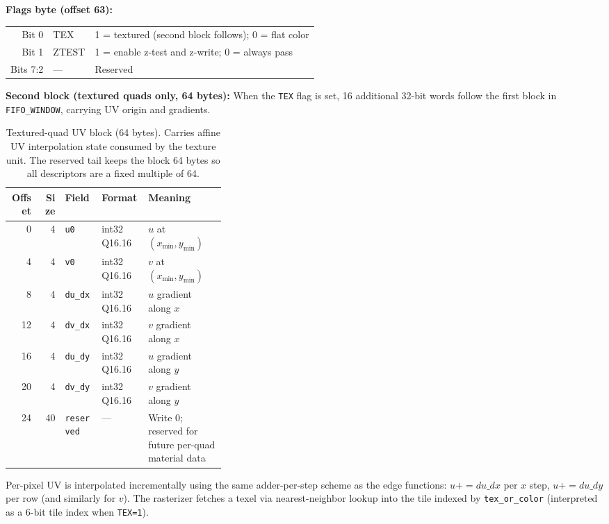 \documentclass[11pt]{article}
\begin{document}
\vspace{0.8em}
\noindent\textbf{Flags byte (offset 63):}

\begin{tabular}{rll}
Bit 0 & TEX   & 1 = textured (second block follows); 0 = flat color \\
Bit 1 & ZTEST & 1 = enable z-test and z-write; 0 = always pass \\
Bits 7:2 & --- & Reserved \\
\end{tabular}

\vspace{0.8em}
\noindent\textbf{Second block (textured quads only, 64 bytes):} When the \texttt{TEX} flag is set, 16 additional 32-bit words follow the first block in \texttt{FIFO\_WINDOW}, carrying UV origin and gradients.

\begin{table}[h]
\centering
\small
\begin{tabular}{rrllp{0.36\linewidth}}
\toprule
\textbf{Offset} & \textbf{Size} & \textbf{Field} & \textbf{Format} & \textbf{Meaning} \\
\midrule
 0 & 4 & \texttt{u0}      & int32 Q16.16 & $u$ at $(x_{\min}, y_{\min})$ \\
 4 & 4 & \texttt{v0}      & int32 Q16.16 & $v$ at $(x_{\min}, y_{\min})$ \\
 8 & 4 & \texttt{du\_dx}  & int32 Q16.16 & $u$ gradient along $x$ \\
12 & 4 & \texttt{dv\_dx}  & int32 Q16.16 & $v$ gradient along $x$ \\
16 & 4 & \texttt{du\_dy}  & int32 Q16.16 & $u$ gradient along $y$ \\
20 & 4 & \texttt{dv\_dy}  & int32 Q16.16 & $v$ gradient along $y$ \\
24 & 40 & \texttt{reserved} & ---        & Write 0; reserved for future per-quad material data \\
\bottomrule
\end{tabular}
\caption{Textured-quad UV block (64 bytes). Carries affine UV interpolation state consumed by the texture unit. The reserved tail keeps the block 64 bytes so all descriptors are a fixed multiple of 64.}
\end{table}

Per-pixel UV is interpolated incrementally using the same adder-per-step scheme as the edge functions: $u \mathrel{{+}{=}} du\_dx$ per $x$ step, $u \mathrel{{+}{=}} du\_dy$ per row (and similarly for $v$). The rasterizer fetches a texel via nearest-neighbor lookup into the tile indexed by \texttt{tex\_or\_color} (interpreted as a 6-bit tile index when \texttt{TEX=1}).
\end{document}
